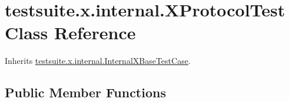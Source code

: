 \hypertarget{classtestsuite_1_1x_1_1internal_1_1_x_protocol_test}{}\section{testsuite.\+x.\+internal.\+X\+Protocol\+Test Class Reference}
\label{classtestsuite_1_1x_1_1internal_1_1_x_protocol_test}


Inherits \mbox{\hyperlink{classtestsuite_1_1x_1_1internal_1_1_internal_x_base_test_case}{testsuite.\+x.\+internal.\+Internal\+X\+Base\+Test\+Case}}.

\subsection*{Public Member Functions}
